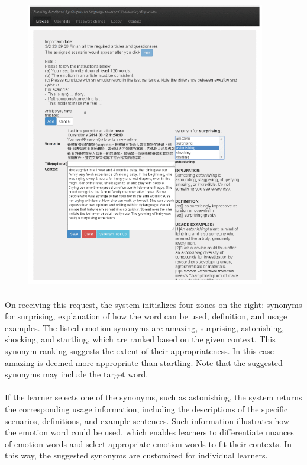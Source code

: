 \documentclass[a4paper,12pt,oneside]{article}
\begin{document}
\begin{figure}[H]
\includegraphics[height=12.5cm,width=10.46cm]{Figure2.png}
\centering
\end{figure}

\paragraph{}
On receiving this request, the system initializes four zones on the right: synonyms for surprising, explanation of how the word can be used, definition, and usage examples. The listed emotion synonyms are amazing, surprising, astonishing, shocking, and startling, which are ranked based on the given context. This synonym ranking suggests the extent of their appropriateness. In this case amazing is deemed more appropriate than startling. Note that the suggested synonyms may include the target word. 
\paragraph{}
If the learner selects one of the synonyms, such as astonishing, the system returns the corresponding usage information, including the descriptions of the specific scenarios, definitions, and example sentences. Such information illustrates how the emotion word could be used, which enables learners to differentiate nuances of emotion words and select appropriate emotion words to fit their contexts. In this way, the suggested synonyms are customized for individual learners. 
\end{document}
